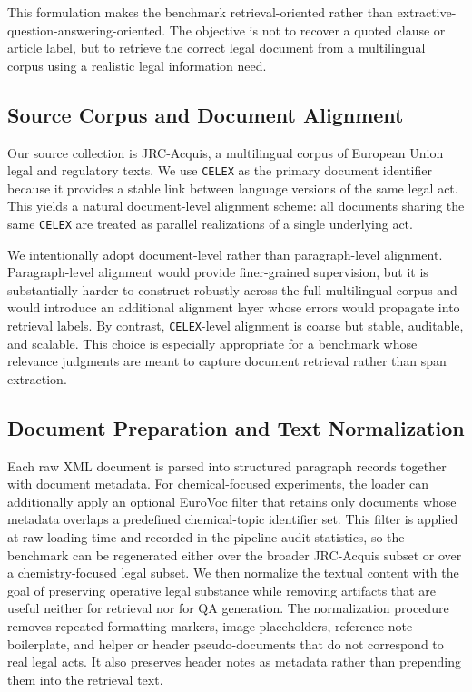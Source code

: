 This formulation makes the benchmark retrieval-oriented rather than extractive-question-answering-oriented. The objective is not to recover a quoted clause or article label, but to retrieve the correct legal document from a multilingual corpus using a realistic legal information need.

\subsection{Source Corpus and Document Alignment}

Our source collection is JRC-Acquis, a multilingual corpus of European Union legal and regulatory texts. We use \texttt{CELEX} as the primary document identifier because it provides a stable link between language versions of the same legal act. This yields a natural document-level alignment scheme: all documents sharing the same \texttt{CELEX} are treated as parallel realizations of a single underlying act.

We intentionally adopt document-level rather than paragraph-level alignment. Paragraph-level alignment would provide finer-grained supervision, but it is substantially harder to construct robustly across the full multilingual corpus and would introduce an additional alignment layer whose errors would propagate into retrieval labels. By contrast, \texttt{CELEX}-level alignment is coarse but stable, auditable, and scalable. This choice is especially appropriate for a benchmark whose relevance judgments are meant to capture document retrieval rather than span extraction.

\subsection{Document Preparation and Text Normalization}

Each raw XML document is parsed into structured paragraph records together with document metadata. For chemical-focused experiments, the loader can additionally apply an optional EuroVoc filter that retains only documents whose metadata overlaps a predefined chemical-topic identifier set. This filter is applied at raw loading time and recorded in the pipeline audit statistics, so the benchmark can be regenerated either over the broader JRC-Acquis subset or over a chemistry-focused legal subset. We then normalize the textual content with the goal of preserving operative legal substance while removing artifacts that are useful neither for retrieval nor for QA generation. The normalization procedure removes repeated formatting markers, image placeholders, reference-note boilerplate, and helper or header pseudo-documents that do not correspond to real legal acts. It also preserves header notes as metadata rather than prepending them into the retrieval text.

